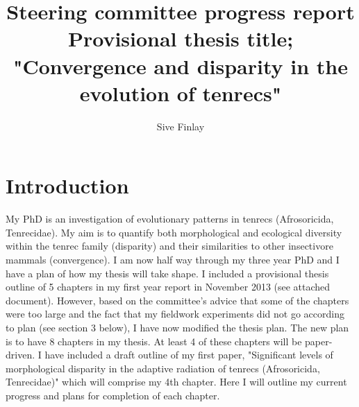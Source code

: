 \documentclass[12pt,a4paper]{article}
\begin{document}
\title{Steering committee progress report\\
Provisional thesis title; "Convergence and disparity in the evolution of tenrecs"}
\author{Sive Finlay}
\maketitle

\section{Introduction}
My PhD is an investigation of evolutionary patterns in tenrecs (Afrosoricida, Tenrecidae). My aim is to quantify both morphological and ecological diversity within the tenrec family (disparity) and their similarities to other insectivore mammals (convergence). 
I am now half way through my three year PhD and I have a plan of how my thesis will take shape. I included a provisional thesis outline of 5 chapters in my first year report in November 2013 (see attached document). However, based on the committee's advice that some of the chapters were too large and the fact that my fieldwork experiments did not go according to plan (see section 3 below), I have now modified the thesis plan.  The new plan is to have 8 chapters in my thesis. At least 4 of these chapters will be paper-driven. I have included a draft outline of my first paper, "Significant levels of morphological disparity in the adaptive radiation of tenrecs (Afrosoricida, Tenrecidae)" which will comprise my 4th chapter.
Here I will outline my current progress and plans for completion of each chapter. 
\end{document}
